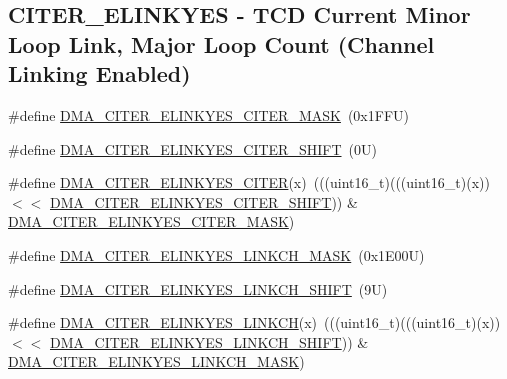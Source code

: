 \subsection*{C\+I\+T\+E\+R\+\_\+\+E\+L\+I\+N\+K\+Y\+ES -\/ T\+CD Current Minor Loop Link, Major Loop Count (Channel Linking Enabled)}
\begin{DoxyCompactItemize}
\item 
\#define \mbox{\hyperlink{group___d_m_a___register___masks_ga6d3dc490db41703ee3444ab83abd49fc}{D\+M\+A\+\_\+\+C\+I\+T\+E\+R\+\_\+\+E\+L\+I\+N\+K\+Y\+E\+S\+\_\+\+C\+I\+T\+E\+R\+\_\+\+M\+A\+SK}}~(0x1\+F\+F\+U)
\item 
\#define \mbox{\hyperlink{group___d_m_a___register___masks_ga73c42915d2235324c9b45698eabb87b4}{D\+M\+A\+\_\+\+C\+I\+T\+E\+R\+\_\+\+E\+L\+I\+N\+K\+Y\+E\+S\+\_\+\+C\+I\+T\+E\+R\+\_\+\+S\+H\+I\+FT}}~(0\+U)
\item 
\#define \mbox{\hyperlink{group___d_m_a___register___masks_ga1175f3bd26aae1cad208710bdef5c4d4}{D\+M\+A\+\_\+\+C\+I\+T\+E\+R\+\_\+\+E\+L\+I\+N\+K\+Y\+E\+S\+\_\+\+C\+I\+T\+ER}}(x)~(((uint16\+\_\+t)(((uint16\+\_\+t)(x)) $<$$<$ \mbox{\hyperlink{group___d_m_a___register___masks_ga73c42915d2235324c9b45698eabb87b4}{D\+M\+A\+\_\+\+C\+I\+T\+E\+R\+\_\+\+E\+L\+I\+N\+K\+Y\+E\+S\+\_\+\+C\+I\+T\+E\+R\+\_\+\+S\+H\+I\+FT}})) \& \mbox{\hyperlink{group___d_m_a___register___masks_ga6d3dc490db41703ee3444ab83abd49fc}{D\+M\+A\+\_\+\+C\+I\+T\+E\+R\+\_\+\+E\+L\+I\+N\+K\+Y\+E\+S\+\_\+\+C\+I\+T\+E\+R\+\_\+\+M\+A\+SK}})
\item 
\#define \mbox{\hyperlink{group___d_m_a___register___masks_ga2cd979a0efa9045304d49655f57747ef}{D\+M\+A\+\_\+\+C\+I\+T\+E\+R\+\_\+\+E\+L\+I\+N\+K\+Y\+E\+S\+\_\+\+L\+I\+N\+K\+C\+H\+\_\+\+M\+A\+SK}}~(0x1\+E00\+U)
\item 
\#define \mbox{\hyperlink{group___d_m_a___register___masks_ga2c85ee95c023b3a2705bc1b393d8261e}{D\+M\+A\+\_\+\+C\+I\+T\+E\+R\+\_\+\+E\+L\+I\+N\+K\+Y\+E\+S\+\_\+\+L\+I\+N\+K\+C\+H\+\_\+\+S\+H\+I\+FT}}~(9\+U)
\item 
\#define \mbox{\hyperlink{group___d_m_a___register___masks_ga33cdcc8c02ec5cf42a01b86c0c2c6b52}{D\+M\+A\+\_\+\+C\+I\+T\+E\+R\+\_\+\+E\+L\+I\+N\+K\+Y\+E\+S\+\_\+\+L\+I\+N\+K\+CH}}(x)~(((uint16\+\_\+t)(((uint16\+\_\+t)(x)) $<$$<$ \mbox{\hyperlink{group___d_m_a___register___masks_ga2c85ee95c023b3a2705bc1b393d8261e}{D\+M\+A\+\_\+\+C\+I\+T\+E\+R\+\_\+\+E\+L\+I\+N\+K\+Y\+E\+S\+\_\+\+L\+I\+N\+K\+C\+H\+\_\+\+S\+H\+I\+FT}})) \& \mbox{\hyperlink{group___d_m_a___register___masks_ga2cd979a0efa9045304d49655f57747ef}{D\+M\+A\+\_\+\+C\+I\+T\+E\+R\+\_\+\+E\+L\+I\+N\+K\+Y\+E\+S\+\_\+\+L\+I\+N\+K\+C\+H\+\_\+\+M\+A\+SK}})

\end{DoxyCompactItemize}
